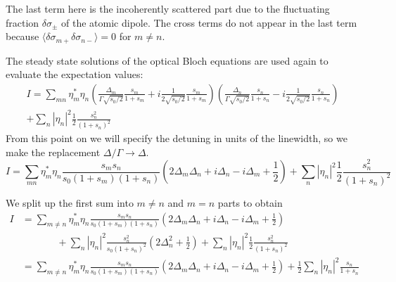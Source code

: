 \documentclass[11pt,letter]{article}
\begin{document}
The last term here is the incoherently scattered part due to the fluctuating
fraction $\delta \sigma_{\pm}$ of the atomic dipole.  The cross terms do not
appear in the last term because $\langle \delta \sigma_{m+} \delta
\sigma_{n-}\rangle =0$ for $m\neq n$.  



The steady state solutions of the optical Bloch equations are used again to
evaluate the expectation values:
\begin{multline}
 I = 
  \sum_{mn}  \eta_{m}^{*}\eta_{n}
    \left(
    \frac{ \Delta_{m} }{ \Gamma  \sqrt{s_{0}/2} } 
    \frac{s_{m}}{ 1 + s_{m} } 
   + i 
    \frac{ 1 } { 2 \sqrt{s_{0}/2} } 
    \frac{s_{m}}{1+s_{m}} 
    \right) 
    \left(
    \frac{ \Delta_{n} }{ \Gamma  \sqrt{s_{0}/2} } 
    \frac{s_{n}}{ 1 + s_{n} } 
   - i 
    \frac{ 1 } { 2 \sqrt{ s_{0}/2 } } 
    \frac{s_{n}}{1+s_{n}} 
    \right) \\
   + \sum_{n} | \eta_{n}|^{2} \frac{1}{2} \frac{ s_{n}^{2} } 
                                               { (1 + s _{n} )^{2} } 
\end{multline}
From this point on we will specify the detuning in units of the linewidth, so
we make the replacement $\Delta/ \Gamma \rightarrow \Delta$. 
\begin{equation}
 I  = 
  \sum_{mn}  \eta_{m}^{*}\eta_{n}
    \frac{ s_{m} s_{n} } { s_{0} ( 1+s_{m} )( 1+s_{n} ) }
    \left(
        2\Delta_{m} \Delta_{n}  
      + i  \Delta_{n} 
      - i  \Delta_{m} 
      + \frac{1}{2}  
    \right)  
   + \sum_{n} | \eta_{n}|^{2} \frac{1}{2} \frac{ s_{n}^{2} } 
                                               { (1 + s _{n} )^{2} } 
\end{equation}

We split up the first sum into $m\neq n$ and $m=n$ parts to obtain 
\begin{equation}
\begin{split} 
 I  & = 
  \sum_{m\neq n}  \eta_{m}^{*}\eta_{n}
    \frac{ s_{m} s_{n} } { s_{0} ( 1+s_{m} )( 1+s_{n} ) }
    \left(
        2\Delta_{m} \Delta_{n}  
      + i  \Delta_{n} 
      - i  \Delta_{m} 
      + \frac{1}{2}  
    \right) \\
 &  \ \ \ \ \ \ \ \ \ \ \ \ \ \ \ \  
  +  
  \sum_{ n}  |\eta_{n}|^{2} 
    \frac{ s_{n}^{2} } { s_{0} ( 1+s_{n} )^{2} }
    \left(
        2\Delta_{n}^{2} 
      + \frac{1}{2}  
    \right)  
   + \sum_{n} | \eta_{n}|^{2} \frac{1}{2} \frac{ s_{n}^{2} } 
                                               { (1 + s _{n} )^{2} } \\
  & = 
  \sum_{m\neq n}  \eta_{m}^{*}\eta_{n}
    \frac{ s_{m} s_{n} } { s_{0} ( 1+s_{m} )( 1+s_{n} ) }
    \left(
        2\Delta_{m} \Delta_{n}  
      + i  \Delta_{n} 
      - i  \Delta_{m} 
      + \frac{1}{2}  
    \right) 
  +  \frac{1}{2}  
  \sum_{ n}  |\eta_{n}|^{2} 
    \frac{ s_{n}  } { 1+s_{n} }
\end{split} 
\end{equation}
\end{document}
